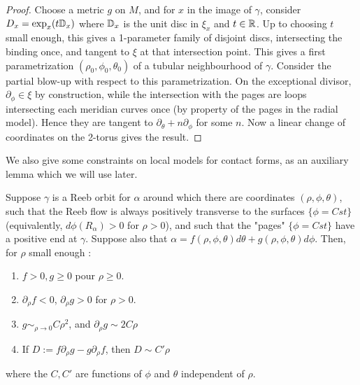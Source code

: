 \documentclass[../main.tex]{subfiles}
\begin{document}
\begin{proof}
Choose a metric $g$ on $M$, and for $x$ in the image of $\gamma$, consider $D_x = \exp_x(t\mathbb{D}_x)$ where $\mathbb{D}_x$ is the unit disc in $\xi_x$ and $t\in\mathbb{R}$. Up to choosing $t$ small enough, this gives a 1-parameter family of disjoint discs, intersecting the binding once, and tangent to $\xi$ at that intersection point. This gives a first parametrization $(\rho_0,\phi_0,\theta_0)$ of a tubular neighbourhood of $\gamma$. Consider the partial blow-up with respect to this parametrization. On the exceptional divisor, $\partial_\phi\in\xi$ by construction, while the intersection with the pages are loops intersecting each meridian curves once (by property of the pages in the radial model). Hence they are tangent to $\partial_\theta + n \partial_\phi$ for some $n$. Now a linear change of coordinates on the 2-torus gives the result.
\end{proof}

We also give some constraints on local models for contact forms, as an auxiliary lemma which we will use later.

\begin{lemma}\label{l:localasymptotics}
Suppose $\gamma$ is a Reeb orbit for $\alpha$ around which there are coordinates $(\rho,\phi,\theta)$, such that the Reeb flow is always positively transverse to the surfaces $\{\phi = Cst\}$ (equivalently, $d\phi(R_\alpha) > 0$ for $\rho > 0$), and such that the "pages" $\{\phi = Cst\}$ have a positive end at $\gamma$. Suppose also that $\alpha = f(\rho,\phi,\theta)d\theta + g(\rho,\phi,\theta)d\phi$. Then, for $\rho$ small enough :
\begin{enumerate}
    \item $f> 0, g\geq 0$ pour $\rho \geq 0$.
    \item $\partial_\rho f < 0$, $\partial_\rho g > 0$ for $\rho > 0$.
    \item $g\displaystyle\sim_{\rho \rightarrow 0} C\rho^2$, and $\partial_\rho g \sim 2C\rho$
    \item If $D:= f\partial_\rho g - g\partial_\rho f$, then $D\sim C' \rho$
\end{enumerate}
where the $C,C'$ are functions of $\phi$ and $\theta$ independent of $\rho$.
\end{lemma}
\end{document}
